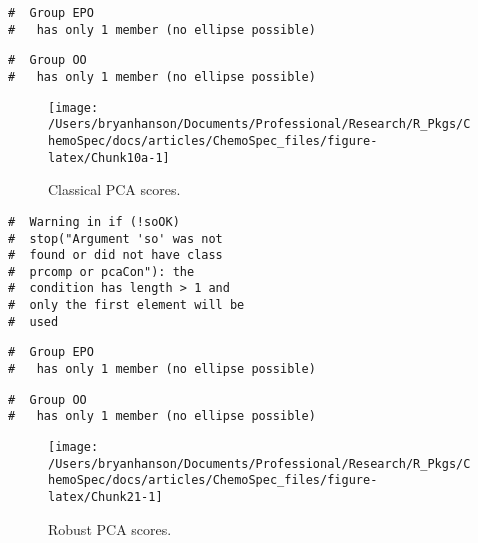 \documentclass[letter,10pt,twocolumn,twoside,printwatermark=false]{pinp}
\begin{document}
\begin{ShadedResult}
\begin{verbatim}
#  Group EPO
#   has only 1 member (no ellipse possible)
\end{verbatim}
\end{ShadedResult}
\begin{ShadedResult}
\begin{verbatim}
#  Group OO
#   has only 1 member (no ellipse possible)
\end{verbatim}
\end{ShadedResult}
\begin{figure}

{\centering \texttt{[image: /Users/bryanhanson/Documents/Professional/Research/R\_Pkgs/ChemoSpec/docs/articles/ChemoSpec\_files/figure-latex/Chunk10a-1]} 

}

\caption{\label{classPCA}Classical PCA scores.}\label{fig:Chunk10a}
\end{figure}

\begin{Shaded}
\begin{Highlighting}[]
\StringTok{ }
   \NormalTok{)}
   \NormalTok{(}\NormalTok{,}\NormalTok{),}
   \NormalTok{,}
   \NormalTok{)}
\end{Highlighting}
\end{Shaded}

\begin{ShadedResult}
\begin{verbatim}
#  Warning in if (!soOK)
#  stop("Argument 'so' was not
#  found or did not have class
#  prcomp or pcaCon"): the
#  condition has length > 1 and
#  only the first element will be
#  used
\end{verbatim}
\end{ShadedResult}
\begin{ShadedResult}
\begin{verbatim}
#  Group EPO
#   has only 1 member (no ellipse possible)
\end{verbatim}
\end{ShadedResult}
\begin{ShadedResult}
\begin{verbatim}
#  Group OO
#   has only 1 member (no ellipse possible)
\end{verbatim}
\end{ShadedResult}
\begin{figure}

{\centering \texttt{[image: /Users/bryanhanson/Documents/Professional/Research/R\_Pkgs/ChemoSpec/docs/articles/ChemoSpec\_files/figure-latex/Chunk21-1]} 

}

\caption{\label{robPCA}Robust PCA scores.}\label{fig:Chunk21}
\end{figure}
\end{document}
